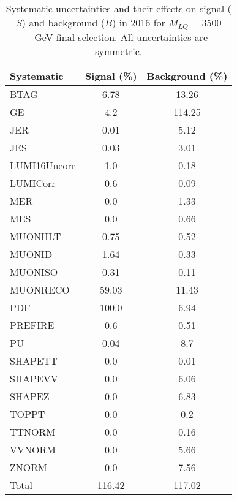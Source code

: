\begin{table}[htbp]
\begin{center}
\caption{Systematic uncertainties and their effects on signal ($S$) and background ($B$) in 2016 for $M_{LQ}=3500$~GeV final selection. All uncertainties are symmetric.}
\begin{tabular}{lcc}
\hline\hline
Systematic & Signal (\%) & Background (\%) \\ \hline 
BTAG & 6.78 & 13.26\\ 
GE & 4.2 & 114.25\\ 
JER & 0.01 & 5.12\\ 
JES & 0.03 & 3.01\\ 
LUMI16Uncorr & 1.0 & 0.18\\ 
LUMICorr & 0.6 & 0.09\\ 
MER & 0.0 & 1.33\\ 
MES & 0.0 & 0.66\\ 
MUONHLT & 0.75 & 0.52\\ 
MUONID & 1.64 & 0.33\\ 
MUONISO & 0.31 & 0.11\\ 
MUONRECO & 59.03 & 11.43\\ 
PDF & 100.0 & 6.94\\ 
PREFIRE & 0.6 & 0.51\\ 
PU & 0.04 & 8.7\\ 
SHAPETT & 0.0 & 0.01\\ 
SHAPEVV & 0.0 & 6.06\\ 
SHAPEZ & 0.0 & 6.83\\ 
TOPPT & 0.0 & 0.2\\ 
TTNORM & 0.0 & 0.16\\ 
VVNORM & 0.0 & 5.66\\ 
ZNORM & 0.0 & 7.56\\ 
Total & 116.42 & 117.02\\ \hline \hline
\end{tabular}
\label{tab:SysUncertainties_uujj_3500}
\end{center}
\end{table}

